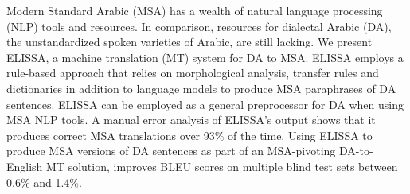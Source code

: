 Modern Standard Arabic (MSA) has a wealth of natural language processing (NLP) tools
 and resources. In comparison, resources for
 dialectal Arabic (DA), the unstandardized spoken
 varieties of Arabic, are still lacking. We
 present ELISSA, a machine translation (MT)
 system for DA to MSA. ELISSA employs a
 rule-based approach that relies on morphological
 analysis, transfer rules and dictionaries
 in addition to language models to produce
 MSA paraphrases of DA sentences. ELISSA
 can be employed as a general preprocessor for
 DA when using MSA NLP tools. A manual
 error analysis of ELISSA's output shows
 that it produces correct MSA translations over
 93\% of the time. Using ELISSA to produce
 MSA versions of DA sentences as part of
 an MSA-pivoting DA-to-English MT solution,
 improves BLEU scores on multiple blind test
 sets between 0.6\% and 1.4\%.

